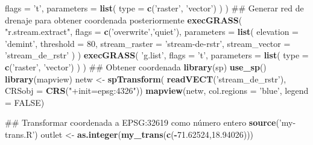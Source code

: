 \documentclass[11pt,]{article}
\newenvironment{Shaded}{\begin{snugshade}}{\end{snugshade}}
\newcommand{\KeywordTok}[1]{\textcolor[rgb]{0.13,0.29,0.53}{\textbf{#1}}}
\newcommand{\DataTypeTok}[1]{\textcolor[rgb]{0.13,0.29,0.53}{#1}}
\newcommand{\DecValTok}[1]{\textcolor[rgb]{0.00,0.00,0.81}{#1}}
\newcommand{\FloatTok}[1]{\textcolor[rgb]{0.00,0.00,0.81}{#1}}
\newcommand{\StringTok}[1]{\textcolor[rgb]{0.31,0.60,0.02}{#1}}
\newcommand{\OtherTok}[1]{\textcolor[rgb]{0.56,0.35,0.01}{#1}}
\newcommand{\OperatorTok}[1]{\textcolor[rgb]{0.81,0.36,0.00}{\textbf{#1}}}
\newcommand{\NormalTok}[1]{#1}
\begin{document}
\begin{Shaded}
\begin{Highlighting}[]
  \DataTypeTok{flags =} \StringTok{'t'}\NormalTok{,}
  \DataTypeTok{parameters =} \KeywordTok{list}\NormalTok{(}
    \DataTypeTok{type =} \KeywordTok{c}\NormalTok{(}\StringTok{'raster'}\NormalTok{, }\StringTok{'vector'}\NormalTok{)}
\NormalTok{  )}
\NormalTok{)}
\NormalTok{## Generar red de drenaje para obtener coordenada posteriormente}
\KeywordTok{execGRASS}\NormalTok{(}
  \StringTok{"r.stream.extract"}\NormalTok{,}
  \DataTypeTok{flags =} \KeywordTok{c}\NormalTok{(}\StringTok{'overwrite'}\NormalTok{,}\StringTok{'quiet'}\NormalTok{),}
  \DataTypeTok{parameters =} \KeywordTok{list}\NormalTok{(}
    \DataTypeTok{elevation =} \StringTok{'demint'}\NormalTok{,}
    \DataTypeTok{threshold =} \DecValTok{80}\NormalTok{,}
    \DataTypeTok{stream_raster =} \StringTok{'stream-de-rstr'}\NormalTok{,}
    \DataTypeTok{stream_vector =} \StringTok{'stream_de_rstr'}
\NormalTok{  )}
\NormalTok{)}
\KeywordTok{execGRASS}\NormalTok{(}
  \StringTok{'g.list'}\NormalTok{,}
  \DataTypeTok{flags =} \StringTok{'t'}\NormalTok{,}
  \DataTypeTok{parameters =} \KeywordTok{list}\NormalTok{(}
    \DataTypeTok{type =} \KeywordTok{c}\NormalTok{(}\StringTok{'raster'}\NormalTok{, }\StringTok{'vector'}\NormalTok{)}
\NormalTok{  )}
\NormalTok{)}
\NormalTok{## Obtener coordenada}
\KeywordTok{library}\NormalTok{(sp)}
\KeywordTok{use_sp}\NormalTok{()}
\KeywordTok{library}\NormalTok{(mapview)}
\NormalTok{netw <-}\StringTok{ }\KeywordTok{spTransform}\NormalTok{(}
  \KeywordTok{readVECT}\NormalTok{(}\StringTok{'stream_de_rstr'}\NormalTok{),}
  \DataTypeTok{CRSobj =} \KeywordTok{CRS}\NormalTok{(}\StringTok{"+init=epsg:4326"}\NormalTok{))}
\KeywordTok{mapview}\NormalTok{(netw, }\DataTypeTok{col.regions =} \StringTok{'blue'}\NormalTok{, }\DataTypeTok{legend =} \OtherTok{FALSE}\NormalTok{)}

\NormalTok{## Transformar coordenada a EPSG:32619 como número entero}
\KeywordTok{source}\NormalTok{(}\StringTok{'my-trans.R'}\NormalTok{)}
\NormalTok{outlet <-}\StringTok{ }\KeywordTok{as.integer}\NormalTok{(}\KeywordTok{my_trans}\NormalTok{(}\KeywordTok{c}\NormalTok{(}\OperatorTok{-}\FloatTok{71.62524}\NormalTok{,}\FloatTok{18.94026}\NormalTok{)))}


\end{Highlighting}
\end{Shaded}
\end{document}
